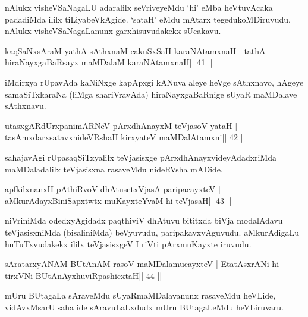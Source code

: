 \begin{artha}
nAlukx visheVSaNagaLU adaralilx seVriveyeMdu `hi' eMba heVtuvAcaka padadiMda ililx tiLiyabeVkAgide. `sataH' eMdu mAtarx tegedukoMDiruvudu, nAlukx visheVSaNagaLanunx garxhisuvudakekx sUcakavu.
\end{artha}

\begin{shl}
kaqSaNxsAraM yathA sAthxnaM cakuSxSaH karaNAtamxnaH |
tathA hiraNayxgaBaRsayx maMDalaM karaNAtamxnaH\hfill || 41 ||
\end{shl}

\begin{artha}
iMdirxya rUpavAda kaNiNxge kapApxgi kANuva aleye heVge sAthxnavo, hAgeye samaSiTxkaraNa (liMga shariVravAda) hiraNayxgaBaRnige sUyaR maMDalave sAthxnavu.
\end{artha}



\begin{shl}
utasxgARdUrxpanimARNeV pArxdhAnayxM teVjasoV yataH |
tasAmxdarxsatavxnideVRshaH kirxyateV maMDalAtamxni\hfill || 42 ||
\end{shl}

\begin{artha}
sahajavAgi rUpasaqSiTxyalilx teVjasisxge pArxdhAnayxvideyAdadxriMda maMDaladalilx teVjasisxna rasaveMdu nideRVsha mADide.
\end{artha}



\begin{shl}
apfkilxnanxH pAthiRvoV dhAtusetxVjasA paripacayxteV |
aMkurAdayxBiniSapxtwtx muKayxteYvaM hi teVjasaH\hfill || 43 ||
\end{shl}

\begin{artha}
niVriniMda odedxyAgidadx paqthiviV dhAtuvu bititxda biVja modalAdavu teVjasisxniMda (bisaliniMda) beVyuvudu, paripakavxvAguvudu. aMkurAdigaLu huTuTxvudakekx ililx teVjasisxgeV I riVti pArxmuKayxte iruvudu.
\end{artha}

\begin{shl}
sAratarxyANAM BUtAnAM rasoV maMDalamucayxteV |
EtatAsxrANi hi tirxVNi BUtAnAyxhuviRpashicxtaH\hfill || 44 ||
\end{shl}

\begin{artha}
mUru BUtagaLa sAraveMdu sUyaRmaMDalavanunx rasaveMdu heVLide, vidAvxMsarU saha ide sAravuLaLxdudx mUru BUtagaLeMdu heVLiruvaru.
\end{artha}

